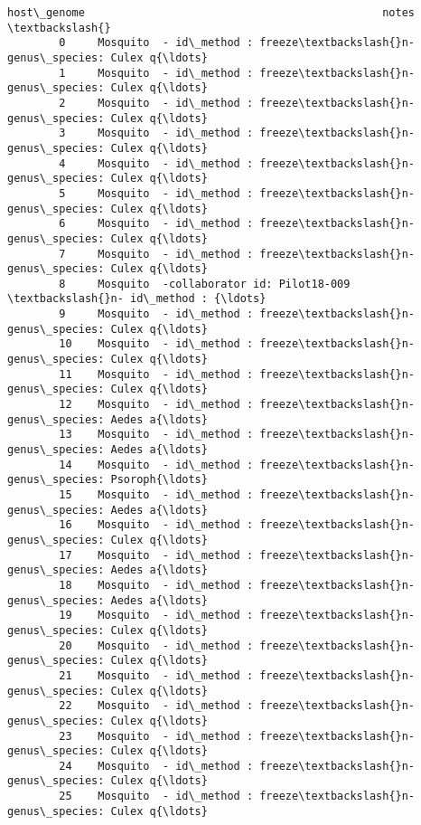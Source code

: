\documentclass[11pt]{article}
\begin{document}
\begin{Verbatim}[commandchars=\\\{\}]
           host\_genome                                              notes  \textbackslash{}
        0     Mosquito  - id\_method : freeze\textbackslash{}n- genus\_species: Culex q{\ldots}   
        1     Mosquito  - id\_method : freeze\textbackslash{}n- genus\_species: Culex q{\ldots}   
        2     Mosquito  - id\_method : freeze\textbackslash{}n- genus\_species: Culex q{\ldots}   
        3     Mosquito  - id\_method : freeze\textbackslash{}n- genus\_species: Culex q{\ldots}   
        4     Mosquito  - id\_method : freeze\textbackslash{}n- genus\_species: Culex q{\ldots}   
        5     Mosquito  - id\_method : freeze\textbackslash{}n- genus\_species: Culex q{\ldots}   
        6     Mosquito  - id\_method : freeze\textbackslash{}n- genus\_species: Culex q{\ldots}   
        7     Mosquito  - id\_method : freeze\textbackslash{}n- genus\_species: Culex q{\ldots}   
        8     Mosquito  -collaborator id: Pilot18-009 \textbackslash{}n- id\_method : {\ldots}   
        9     Mosquito  - id\_method : freeze\textbackslash{}n- genus\_species: Culex q{\ldots}   
        10    Mosquito  - id\_method : freeze\textbackslash{}n- genus\_species: Culex q{\ldots}   
        11    Mosquito  - id\_method : freeze\textbackslash{}n- genus\_species: Culex q{\ldots}   
        12    Mosquito  - id\_method : freeze\textbackslash{}n- genus\_species: Aedes a{\ldots}   
        13    Mosquito  - id\_method : freeze\textbackslash{}n- genus\_species: Aedes a{\ldots}   
        14    Mosquito  - id\_method : freeze\textbackslash{}n- genus\_species: Psoroph{\ldots}   
        15    Mosquito  - id\_method : freeze\textbackslash{}n- genus\_species: Aedes a{\ldots}   
        16    Mosquito  - id\_method : freeze\textbackslash{}n- genus\_species: Culex q{\ldots}   
        17    Mosquito  - id\_method : freeze\textbackslash{}n- genus\_species: Aedes a{\ldots}   
        18    Mosquito  - id\_method : freeze\textbackslash{}n- genus\_species: Aedes a{\ldots}   
        19    Mosquito  - id\_method : freeze\textbackslash{}n- genus\_species: Culex q{\ldots}   
        20    Mosquito  - id\_method : freeze\textbackslash{}n- genus\_species: Culex q{\ldots}   
        21    Mosquito  - id\_method : freeze\textbackslash{}n- genus\_species: Culex q{\ldots}   
        22    Mosquito  - id\_method : freeze\textbackslash{}n- genus\_species: Culex q{\ldots}   
        23    Mosquito  - id\_method : freeze\textbackslash{}n- genus\_species: Culex q{\ldots}   
        24    Mosquito  - id\_method : freeze\textbackslash{}n- genus\_species: Culex q{\ldots}   
        25    Mosquito  - id\_method : freeze\textbackslash{}n- genus\_species: Culex q{\ldots}   

\end{Verbatim}
\end{document}
